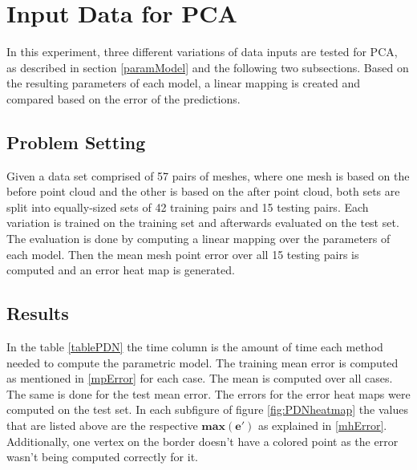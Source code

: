 \section{Input Data for PCA}
In this experiment, three different variations of data inputs are tested for PCA, as described in section \ref{paramModel} and the following two subsections. Based on the resulting parameters of each model, a linear mapping is created and compared based on the error of the predictions.

\subsection{Problem Setting}
Given a data set comprised of 57 pairs of meshes, where one mesh is based on the before point cloud and the other is based on the after point cloud, both sets are split into equally-sized sets of 42 training pairs and 15 testing pairs. Each variation is trained on the training set and afterwards evaluated on the test set. The evaluation is done by computing a linear mapping over the parameters of each model. Then the mean mesh point error over all 15 testing pairs is computed and an error heat map is generated.
\subsection{Results}
In the table \ref{tablePDN} the time column is the amount of time each method needed to compute the parametric model. The training mean error is computed as mentioned in \ref{mpError} for each case. The mean is computed over all cases. The same is done for the test mean error. The errors for the error heat maps were computed on the test set. In each subfigure of figure \ref{fig:PDNheatmap} the values that are listed above are the respective $\mathbf{max(e')}$ as explained in \ref{mhError}. Additionally, one vertex on the border doesn't have a colored point as the error wasn't being computed correctly for it.

